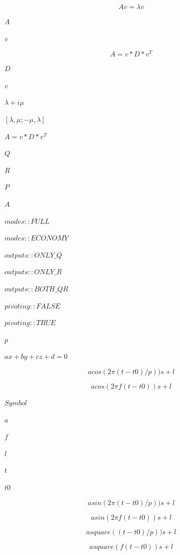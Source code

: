\documentclass{article}
\begin{document}
\[
    A v = \lambda v
\]
\pagebreak

$      A       $
\pagebreak

$      v       $
\pagebreak

\[
        A = v*D*v^T
    \]
\pagebreak

$      D $
\pagebreak

$      v $
\pagebreak

$\lambda + i \mu$
\pagebreak

$[\lambda, \mu; -\mu, \lambda]$
\pagebreak

$A = v*D*v^T$
\pagebreak

$        Q $
\pagebreak

$        R $
\pagebreak

$        P $
\pagebreak

$        A $
\pagebreak

$        modes::FULL     $
\pagebreak

$        modes::ECONOMY  $
\pagebreak

$        outputs::ONLY\_Q     $
\pagebreak

$        outputs::ONLY\_R     $
\pagebreak

$        outputs::BOTH\_QR    $
\pagebreak

$        pivoting::FALSE     $
\pagebreak

$        pivoting::TRUE      $
\pagebreak

$        p $
\pagebreak

$ ax + by + cz + d = 0 $
\pagebreak

\[
        a cos(2 \pi (t - t0) / p)) s + l
    \]
\pagebreak

\[
        a cos(2 \pi f (t - t0)) s + l
    \]
\pagebreak

$        Symbol  $
\pagebreak

$        a       $
\pagebreak

$        f       $
\pagebreak

$        l       $
\pagebreak

$        t       $
\pagebreak

$        t0      $
\pagebreak

\[
        a sin(2 \pi (t - t0) / p)) s + l
    \]
\pagebreak

\[
        a sin(2 \pi f (t - t0)) s + l
    \]
\pagebreak

\[
    a square((t - t0) / p)) s + l
\]
\pagebreak

\[
    a square(f (t - t0)) s + l
\]
\pagebreak
\end{document}

